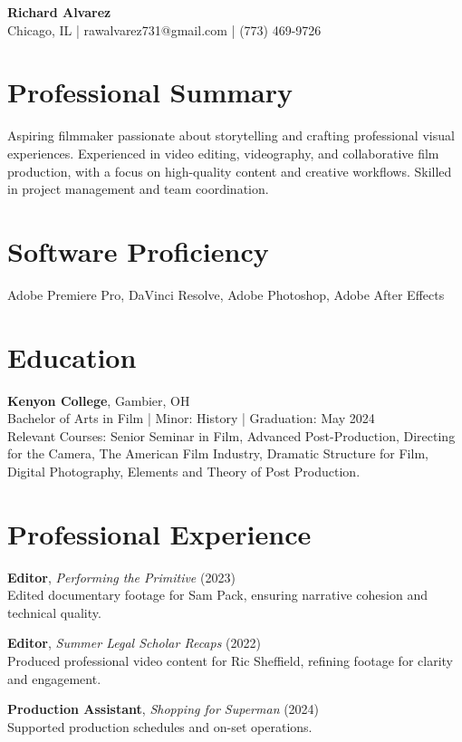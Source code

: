 \documentclass[letterpaper,11pt]{article}
\begin{document}
\begin{center}
    {\LARGE \textbf{Richard Alvarez}}\\[0.8em]
    Chicago, IL | rawalvarez731@gmail.com | (773) 469-9726
\end{center}

\section*{Professional Summary}
Aspiring filmmaker passionate about storytelling and crafting professional visual experiences. Experienced in video editing, videography, and collaborative film production, with a focus on high-quality content and creative workflows. Skilled in project management and team coordination.

\section*{Software Proficiency}
Adobe Premiere Pro, DaVinci Resolve, Adobe Photoshop, Adobe After Effects

\section*{Education}
\textbf{Kenyon College}, Gambier, OH\\
Bachelor of Arts in Film | Minor: History | Graduation: May 2024\\
Relevant Courses: Senior Seminar in Film, Advanced Post-Production, Directing for the Camera, The American Film Industry, Dramatic Structure for Film, Digital Photography, Elements and Theory of Post Production.

\section*{Professional Experience}
\textbf{Editor}, \textit{Performing the Primitive} (2023)\\
Edited documentary footage for Sam Pack, ensuring narrative cohesion and technical quality.

\textbf{Editor}, \textit{Summer Legal Scholar Recaps} (2022)\\
Produced professional video content for Ric Sheffield, refining footage for clarity and engagement.

\textbf{Production Assistant}, \textit{Shopping for Superman} (2024)\\
Supported production schedules and on-set operations.
\end{document}
